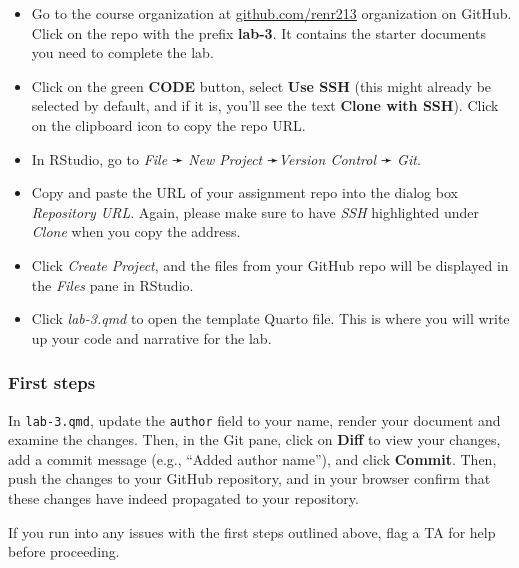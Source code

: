\documentclass[
  letterpaper,
  DIV=11,
  numbers=noendperiod]{scrartcl}
\begin{document}
\begin{tcolorbox}
\begin{itemize}
\item
  Go to the course organization at
  \href{https://github.com/renr213}{github.com/renr213} organization on
  GitHub. Click on the repo with the prefix \textbf{lab-3}. It contains
  the starter documents you need to complete the lab.
\item
  Click on the green \textbf{CODE} button, select \textbf{Use SSH} (this
  might already be selected by default, and if it is, you'll see the
  text \textbf{Clone with SSH}). Click on the clipboard icon to copy the
  repo URL.
\item
  In RStudio, go to \emph{File} ➛ \emph{New Project} ➛\emph{Version
  Control} ➛ \emph{Git}.
\item
  Copy and paste the URL of your assignment repo into the dialog box
  \emph{Repository URL}. Again, please make sure to have \emph{SSH}
  highlighted under \emph{Clone} when you copy the address.
\item
  Click \emph{Create Project}, and the files from your GitHub repo will
  be displayed in the \emph{Files} pane in RStudio.
\item
  Click \emph{lab-3.qmd} to open the template Quarto file. This is where
  you will write up your code and narrative for the lab.
\end{itemize}

\subsubsection{First steps}\label{first-steps}

In \texttt{lab-3.qmd}, update the \texttt{author} field to your name,
render your document and examine the changes. Then, in the Git pane,
click on \textbf{Diff} to view your changes, add a commit message (e.g.,
``Added author name''), and click \textbf{Commit}. Then, push the
changes to your GitHub repository, and in your browser confirm that
these changes have indeed propagated to your repository.

\end{tcolorbox}

\begin{tcolorbox}[enhanced jigsaw, toptitle=1mm, bottomrule=.15mm, colbacktitle=quarto-callout-important-color!10!white, colframe=quarto-callout-important-color-frame, leftrule=.75mm, breakable, toprule=.15mm, colback=white, arc=.35mm, coltitle=black, left=2mm, opacitybacktitle=0.6, bottomtitle=1mm, opacityback=0, title=\textcolor{quarto-callout-important-color}{\faExclamation}\hspace{0.5em}{Important}, titlerule=0mm, rightrule=.15mm]

If you run into any issues with the first steps outlined above, flag a
TA for help before proceeding.

\end{tcolorbox}
\end{document}
